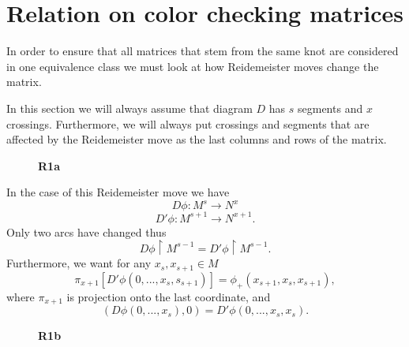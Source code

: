 \section{Relation on color checking matrices}

In order to ensure that all matrices that stem from the same knot are considered in one equivalence class we must look at how Reidemeister moves change the matrix. 

In this section we will always assume that diagram $D$ has $s$ segments and $x$ crossings. Furthermore, we will always put crossings and segments that are affected by the Reidemeister move as the last columns and rows of the matrix.

\begin{figure}[h!]\centering 
  \textbf{R1a}
  \medskip

\end{figure}

In the case of this Reidemeister move we have 
$$D\phi:M^s\to N^x$$
$$D'\phi:M^{s+1}\to N^{x+1}.$$
Only two arcs have changed thus 
$$D\phi\restriction M^{s-1}=D'\phi\restriction M^{s-1}.$$
Furthermore, we want for any $x_s, x_{s+1}\in M$
$$\pi_{x+1}[D'\phi(0,..., x_s, s_{s+1})]=\phi_+(x_{s+1},x_s,x_{s+1}),$$
where $\pi_{x+1}$ is projection onto the last coordinate, and 
$$(D\phi(0,..., x_s), 0)=D'\phi(0,..., x_s, x_s).$$

\begin{figure}[h!]\centering 
  \textbf{R1b}
  \medskip

\end{figure}

